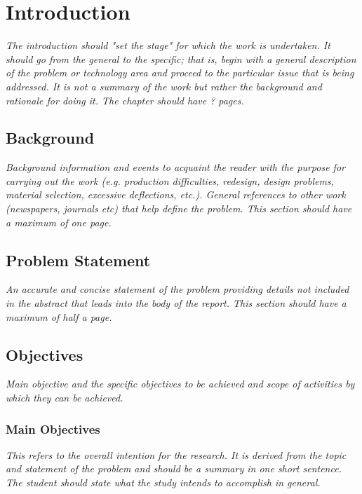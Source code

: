 \chapter{Introduction}
\label{cha:Introduction}      %

\emph{The introduction should "set the stage" for which the work is undertaken.
	It should go from the general to the specific; that is, begin with a general description of the problem or technology area and proceed to the particular issue that is being addressed.
	It is not a summary of the work but rather the background and rationale for doing it.
	The chapter should have ? pages.}

\section{Background}
\emph{Background information and events to acquaint the reader with the purpose for carrying out the work (e.g. production difficulties, redesign, design problems, material selection, excessive deflections, etc.).
General references to other work (newspapers, journals etc) that help define the problem.
This section should have a maximum of one page.}

\section{Problem Statement}
\emph{An accurate and concise statement of the problem providing details not included in the abstract that leads into the body of the report.
This section should have a maximum of half a page.}

\section{Objectives}
\emph{Main objective and the specific objectives to be achieved and scope of activities by which they can be achieved.}

\subsection{Main Objectives}
\emph{This refers to the overall intention for the research.
	It is derived from the topic and statement of the problem and should be a summary in one short sentence.
	The student should state what the study intends to accomplish in general.}

